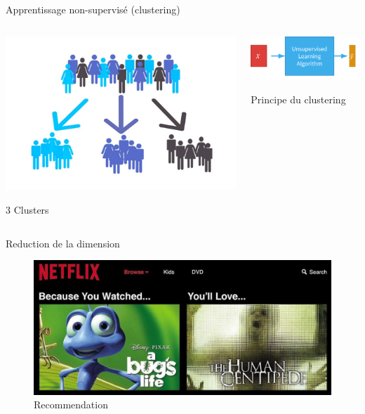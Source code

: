 \documentclass{beamer}
\begin{document}
	
	\begin{frame}{Apprentissage non-supervisé (clustering)}
			\begin{columns}
				\begin{column}{0.5\textwidth}
					\centering
					\includegraphics[width=\textwidth]{segmentation.jpg}
					\par
				$3$ Clusters
				\end{column}
				
				\begin{column}{0.5\textwidth}
					\centering
					\includegraphics[width=\textwidth]{Machine-Learning-9.png}
					\par
					Principe du clustering
				\end{column}
			\end{columns}
	\end{frame}
		\begin{frame}{Reduction de la dimension}
		\centering
		\begin{figure}[h]
			\includegraphics[width=0.85\linewidth]{Net.png}
			\caption{Recommendation}
		\end{figure}
	\end{frame}
\end{document}
